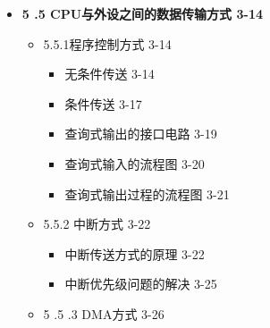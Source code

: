 \documentclass[zihao=5,linespread=1,heading=false,autoindent=0pt]{ctexart}
\newenvironment{citemize}%
{\begin{itemize}[parsep=0pt,itemsep=0pt,topsep=0pt,partopsep=0pt,labelwidth=1em,leftmargin=*]}
{\end{itemize}}
\theoremstyle{exampstyle} \newtheorem{definition}{定义}[section]
\theoremstyle{exampstyle} \newtheorem{example}{例}[section]
\theoremstyle{exampstyle} \newtheorem{theorem}{定理}[section]
\theoremstyle{exampstyle} \newtheorem{lemma}{引理}[section]
\theoremstyle{exampstyle} \newtheorem{myproof}{证明}[section]
\begin{document}
\begin{multicols*}{3}
\begin{citemize}
      \begin{citemize}
       
      \item
        5.4.1 接口的功能 3-8
    
        \begin{citemize}
         
        \item
          接口组成：硬件电路和软件编程 3-10
        \end{citemize}
      \item
        5.4.2 接口与系统的连接 3-11
    
        \begin{citemize}
         
        \item
          典型的I/O部件和外部电路连接图 3-11
        \end{citemize}
      \end{citemize}
    \item
      \textbf{5 .5 CPU与外设之间的数据传输方式 3-14}
    
      \begin{citemize}
       
      \item
        5.5.1程序控制方式 3-14
    
        \begin{citemize}
         
        \item
          无条件传送 3-14
        \item
          条件传送 3-17
        \item
          查询式输出的接口电路 3-19
        \item
          查询式输入的流程图 3-20
        \item
          查询式输出过程的流程图 3-21
        \end{citemize}
      \item
        5.5.2 中断方式 3-22
    
        \begin{citemize}
         
        \item
          中断传送方式的原理 3-22
        \item
          中断优先级问题的解决 3-25
        \end{citemize}
      \item
        5 .5 .3 DMA方式 3-26
    
        \begin{citemize}
         

\end{citemize}
\end{citemize}
\end{citemize}
\end{multicols*}
\end{document}
